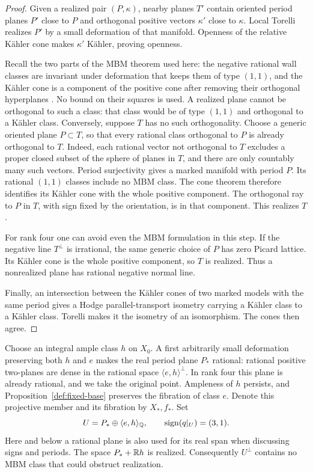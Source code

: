 \begin{proof}
Given a realized pair $(P,\kappa)$, nearby planes $T'$ contain oriented
period planes $P'$ close to $P$ and orthogonal positive vectors
$\kappa'$ close to $\kappa$.  Local Torelli realizes $P'$ by a small
deformation of that manifold.  Openness of the relative K\"ahler cone
makes $\kappa'$ K\"ahler, proving openness.

Recall the two parts of the MBM theorem used here: the negative rational
wall classes are invariant under deformation that keeps them of type
$(1,1)$, and the K\"ahler cone is a component of the positive cone
after removing their orthogonal hyperplanes
\cite[Theorems~1.17 and~1.19]{AmerikVerbitsky2015}.
No bound on their squares is used.  A realized plane cannot be
orthogonal to such a class: that class would be of type $(1,1)$ and
orthogonal to a K\"ahler class.  Conversely, suppose $T$ has no such
orthogonality.  Choose a generic oriented plane $P\subset T$, so that
every rational class orthogonal to $P$ is already orthogonal to $T$.
Indeed, each rational vector not orthogonal to $T$ excludes a proper
closed subset of the sphere of planes in $T$, and there are only
countably many such vectors.  Period surjectivity gives a marked
manifold with period $P$.  Its rational $(1,1)$ classes include no
MBM class.  The cone theorem therefore identifies its K\"ahler cone
with the whole positive component.  The orthogonal ray to $P$ in $T$,
with sign fixed by the orientation, is in that component.  This realizes
$T$.

For rank four one can avoid even the MBM formulation in this step.
If the negative line $T^\perp$ is irrational, the same generic choice
of $P$ has zero Picard lattice.  Its K\"ahler cone is the whole positive
component, so $T$ is realized.  Thus a nonrealized plane has rational
negative normal line.

Finally, an intersection between the K\"ahler cones of two marked models
with the same period gives a Hodge parallel-transport isometry carrying
a K\"ahler class to a K\"ahler class.  Torelli makes it the isometry of
an isomorphism.  The cones then agree.
\end{proof}

Choose an integral ample class $h$ on $X_0$.  A first arbitrarily small
deformation preserving both $h$ and $e$ makes the real period plane
$P_*$ rational: rational positive two-planes are dense in the rational
space $\langle e,h\rangle^\perp$.  In rank four this plane is already
rational, and we take the original point.  Ampleness of $h$ persists, and
Proposition~\ref{def:fixed-base} preserves the fibration of class $e$.
Denote this projective member and its fibration by $X_*,f_*$.
Set
\begin{equation}\label{secsys:four-space}
 U=P_*\oplus\langle e,h\rangle_{\mathbb Q},
 \qquad \operatorname{sign}(q|_U)=(3,1).
\end{equation}
Here and below a rational plane is also used for its real span when
discussing signs and periods.  The space
$P_*+\mathbb R h$ is realized.  Consequently $U^\perp$ contains no MBM
class that could obstruct realization.

